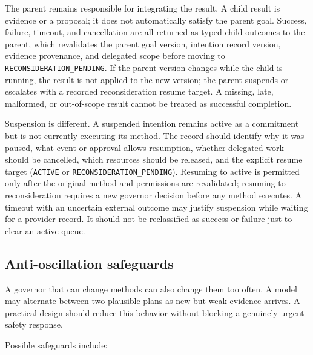 The parent remains responsible for integrating the result. A child result is evidence or a proposal; it does not automatically satisfy the parent goal. Success, failure, timeout, and cancellation are all returned as typed child outcomes to the parent, which revalidates the parent goal version, intention record version, evidence provenance, and delegated scope before moving to \texttt{RECONSIDERATION\_PENDING}. If the parent version changes while the child is running, the result is not applied to the new version; the parent suspends or escalates with a recorded reconsideration resume target. A missing, late, malformed, or out-of-scope result cannot be treated as successful completion.

Suspension is different. A suspended intention remains active as a commitment but is not currently executing its method. The record should identify why it was paused, what event or approval allows resumption, whether delegated work should be cancelled, which resources should be released, and the explicit resume target (\texttt{ACTIVE} or \texttt{RECONSIDERATION\_PENDING}). Resuming to active is permitted only after the original method and permissions are revalidated; resuming to reconsideration requires a new governor decision before any method executes. A timeout with an uncertain external outcome may justify suspension while waiting for a provider record. It should not be reclassified as success or failure just to clear an active queue.

\subsection{Anti-oscillation safeguards}

A governor that can change methods can also change them too often. A model may alternate between two plausible plans as new but weak evidence arrives. A practical design should reduce this behavior without blocking a genuinely urgent safety response.

Possible safeguards include:


